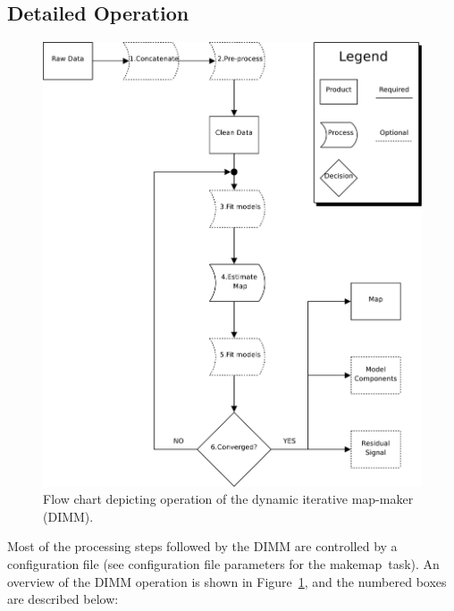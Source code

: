 \documentclass[twoside,11pt]{article}
\newcommand{\xref}[3]{#1}
\renewcommand{\_}{\texttt{\symbol{95}}}
\newcommand{\task}[1]{\textsf{#1}}
\newcommand{\makemap}{\xref{\task{makemap}}{sun258}{MAKEMAP}}
\begin{document}
\subsection{Detailed Operation\label{se:dimmdetails}}

\begin{figure}
\begin{center}
\includegraphics[width=\linewidth]{sun258_dimm_flow}
\caption{Flow chart depicting operation of the dynamic iterative
  map-maker (DIMM).}
\label{fig:dimm_flow}
\end{center}
\end{figure}

Most of the processing steps followed by the DIMM are controlled by a
configuration file (see configuration file parameters for the
\makemap\ task). An overview of the DIMM operation is shown in
Figure~\ref{fig:dimm_flow}, and the numbered boxes are described
below:
\end{document}
